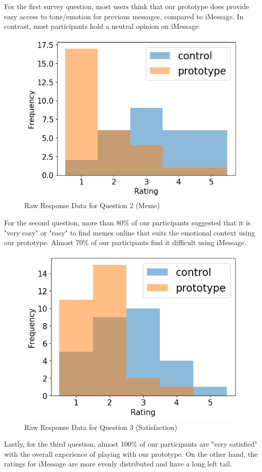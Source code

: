 \documentclass[acmsmall,screen,authorversion,nonacm]{acmart}
\begin{document}
For the first survey question, most users think that our prototype does provide easy access to tone/emotion for previous messages, compared to iMessage. In contrast, most participants hold a neutral opinion on iMessage. 

\begin{figure}[H]
\begin{center}
\includegraphics[width=0.6\linewidth]{figures/stats_resultsoutput2.new.png}
\caption{Raw Response Data for Question 2 (Meme)}
\label{fig:results2}
\Description{}
\end{center}
\end{figure}

For the second question, more than 80\% of our participants suggested that it is "very easy" or "easy" to find memes online that suits the emotional context using our prototype. Almost 70\% of our participants find it difficult using iMessage. 

\begin{figure}[H]
\begin{center}
\includegraphics[width=0.6\linewidth]{figures/stats_resultsoutput3.new.png}
\caption{Raw Response Data for Question 3 (Satisfaction)}
\label{fig:results3}
\Description{}
\end{center}
\end{figure}

Lastly, for the third question, almost 100\% of our participants are "very satisfied" with the overall experience of playing with our prototype. On the other hand, the ratings for iMessage are more evenly distributed and have a long left tail. 
\end{document}
